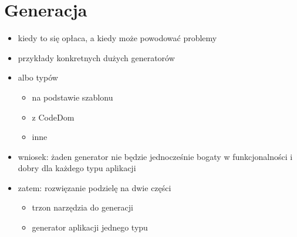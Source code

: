 \chapter{Generacja} \label{chap:generation}

\begin{itemize}
 \item kiedy to się opłaca, a kiedy może powodować problemy
 \item przykłady konkretnych dużych generatorów
 \item albo typów
  \begin{itemize}
   \item na podstawie szablonu
   \item z CodeDom
   \item inne
  \end{itemize}
 \item wniosek: żaden generator nie będzie jednocześnie bogaty w funkcjonalności i dobry dla każdego typu aplikacji
 \item zatem: rozwięzanie podzielę na dwie części
  \begin{itemize}
   \item trzon narzędzia do generacji
   \item generator aplikacji jednego typu
  \end{itemize}
\end{itemize}
